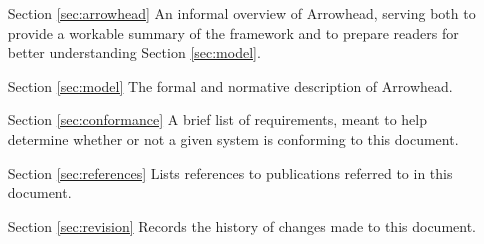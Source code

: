 \begin{itemize}[leftmargin=3cm,rightmargin=0pt,labelwidth=2cm,labelsep=0pt,itemindent=0pt,parsep=0.1cm,topsep=0.1cm,align=left]


\item[Section \ref{sec:arrowhead}]
An informal overview of Arrowhead, serving both to provide a workable summary of the framework and to prepare readers for better understanding Section \ref{sec:model}.

\item[Section \ref{sec:model}]
The formal and normative description of Arrowhead.

\item[Section \ref{sec:conformance}]
A brief list of requirements, meant to help determine whether or not a given system is conforming to this document.

\item[Section \ref{sec:references}]
Lists references to publications referred to in this document.

\item[Section \ref{sec:revision}]
Records the history of changes made to this document.

\end{itemize}
